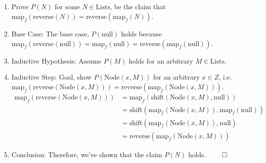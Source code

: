 \documentclass[11pt]{article}
\begin{document}
\subsection{} %
\begin{enumerate}
	\item Prove $P(N)$ for some $N \in \text{Lists}$, be the claim that $\text{map}_f(\text{reverse}(N)) = \text{reverse}(\text{map}_f(N))$.
	\item Base Case: The base case, $P(\text{null})$ holds because $\text{map}_f(\text{reverse}(\text{null})) = \text{map}_f(\text{null}) = \text{reverse}(\text{map}_f(\text{null}))$. 
	\item Inductive Hypothesis: Assume $P(M)$ holds for an arbitrary $M \in \text{Lists}$. 
	\item Inductive Step: Goal, show $P(\text{Node}(x, M))$ for an arbitrary $x \in Z$, i.e. $\text{map}_f(\text{reverse}(\text{Node}(x, M))) = \text{reverse}(\text{map}_f(\text{Node}(x, M)))$. 
	\begin{align*}
		\text{map}_f(\text{reverse}(\text{Node}(x, M))) &= \text{map}_f(\text{shift}(\text{Node}(x, M), \text{null})) \tag*{Definition of reverse()} \\
		&= \text{shift}(\text{map}_f(\text{Node}(x, M)), \text{map}_f(\text{null})) \tag*{5.b Proof} \\
		&= \text{shift}(\text{map}_f(\text{Node}(x, M)), \text{null}) \tag*{Definition of map$_f$()} \\
		&= \text{reverse}(\text{map}_f(\text{Node}(x,  M))) \tag*{Definition of reverse()} 
	\end{align*}
	\item Conclusion: Therefore, we've shown that the claim $P(N)$ holds. $\qed$
\end{enumerate}
\end{document}
